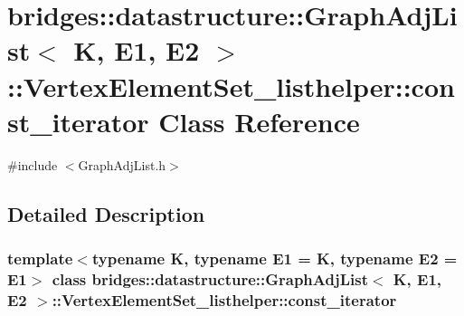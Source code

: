 \hypertarget{classbridges_1_1datastructure_1_1_graph_adj_list_1_1_vertex_element_set__listhelper_1_1const__iterator}{}\section{bridges\+::datastructure\+::Graph\+Adj\+List$<$ K, E1, E2 $>$\+::Vertex\+Element\+Set\+\_\+listhelper\+::const\+\_\+iterator Class Reference}
\label{classbridges_1_1datastructure_1_1_graph_adj_list_1_1_vertex_element_set__listhelper_1_1const__iterator}


{\ttfamily \#include $<$Graph\+Adj\+List.\+h$>$}



\subsection{Detailed Description}
\subsubsection*{template$<$typename K, typename E1 = K, typename E2 = E1$>$\newline
class bridges\+::datastructure\+::\+Graph\+Adj\+List$<$ K, E1, E2 $>$\+::\+Vertex\+Element\+Set\+\_\+listhelper\+::const\+\_\+iterator}

